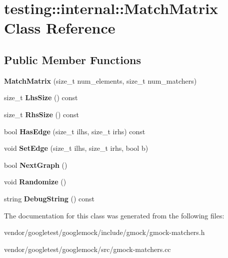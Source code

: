 \hypertarget{classtesting_1_1internal_1_1_match_matrix}{}\section{testing\+:\+:internal\+:\+:Match\+Matrix Class Reference}
\label{classtesting_1_1internal_1_1_match_matrix}
\subsection*{Public Member Functions}
\begin{DoxyCompactItemize}
\item 
\mbox{\label{classtesting_1_1internal_1_1_match_matrix_afa3313976a69b2a954b2f8b8840c37bb}} 
{\bfseries Match\+Matrix} (size\+\_\+t num\+\_\+elements, size\+\_\+t num\+\_\+matchers)
\item 
\mbox{\label{classtesting_1_1internal_1_1_match_matrix_a337d9793c61d985dbc1be166e34eed61}} 
size\+\_\+t {\bfseries Lhs\+Size} () const
\item 
\mbox{\label{classtesting_1_1internal_1_1_match_matrix_aff068e9fed3a42466c5da8766ac43134}} 
size\+\_\+t {\bfseries Rhs\+Size} () const
\item 
\mbox{\label{classtesting_1_1internal_1_1_match_matrix_a94c7641a932739734cb2207b1bca4036}} 
bool {\bfseries Has\+Edge} (size\+\_\+t ilhs, size\+\_\+t irhs) const
\item 
\mbox{\label{classtesting_1_1internal_1_1_match_matrix_aac7e9c6e0e4b51e6b1334829a0781021}} 
void {\bfseries Set\+Edge} (size\+\_\+t ilhs, size\+\_\+t irhs, bool b)
\item 
\mbox{\label{classtesting_1_1internal_1_1_match_matrix_a3a35e2d6107c225537d7e776465a7893}} 
bool {\bfseries Next\+Graph} ()
\item 
\mbox{\label{classtesting_1_1internal_1_1_match_matrix_aff1f0ae748f4a5c96117c0f27b493ac6}} 
void {\bfseries Randomize} ()
\item 
\mbox{\label{classtesting_1_1internal_1_1_match_matrix_a9dc07616205c58e2747dead0a14467b2}} 
string {\bfseries Debug\+String} () const
\end{DoxyCompactItemize}


The documentation for this class was generated from the following files\+:\begin{DoxyCompactItemize}
\item 
vendor/googletest/googlemock/include/gmock/gmock-\/matchers.\+h\item 
vendor/googletest/googlemock/src/gmock-\/matchers.\+cc\end{DoxyCompactItemize}
